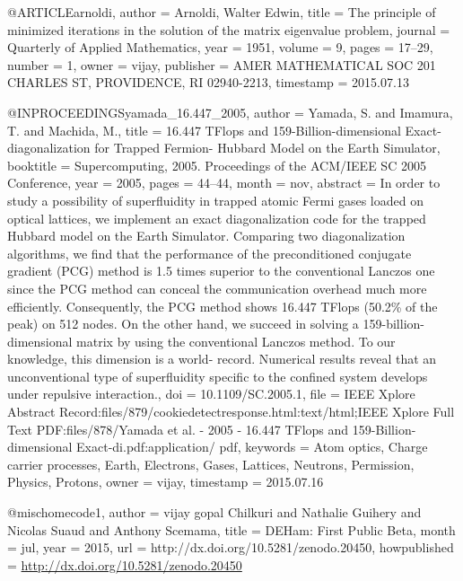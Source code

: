 @ARTICLE{arnoldi,
  author = {Arnoldi, Walter Edwin},
  title = {The principle of minimized iterations in the solution of the matrix
	eigenvalue problem},
  journal = {Quarterly of Applied Mathematics},
  year = {1951},
  volume = {9},
  pages = {17--29},
  number = {1},
  owner = {vijay},
  publisher = {AMER MATHEMATICAL SOC 201 CHARLES ST, PROVIDENCE, RI 02940-2213},
  timestamp = {2015.07.13}
}

@INPROCEEDINGS{yamada_16.447_2005,
  author = {Yamada, S. and Imamura, T. and Machida, M.},
  title = {16.447 {TFlops} and 159-{Billion}-dimensional {Exact}-diagonalization
	for {Trapped} {Fermion}- {Hubbard} {Model} on the {Earth} {Simulator}},
  booktitle = {Supercomputing, 2005. {Proceedings} of the {ACM}/{IEEE} {SC} 2005
	{Conference}},
  year = {2005},
  pages = {44--44},
  month = nov,
  abstract = {In order to study a possibility of superfluidity in trapped atomic
	Fermi gases loaded on optical lattices, we implement an exact diagonalization
	code for the trapped Hubbard model on the Earth Simulator. Comparing
	two diagonalization algorithms, we find that the performance of the
	preconditioned conjugate gradient (PCG) method is 1.5 times superior
	to the conventional Lanczos one since the PCG method can conceal
	the communication overhead much more efficiently. Consequently, the
	PCG method shows 16.447 TFlops (50.2\% of the peak) on 512 nodes.
	On the other hand, we succeed in solving a 159-billion- dimensional
	matrix by using the conventional Lanczos method. To our knowledge,
	this dimension is a world- record. Numerical results reveal that
	an unconventional type of superfluidity specific to the confined
	system develops under repulsive interaction.},
  doi = {10.1109/SC.2005.1},
  file = {IEEE Xplore Abstract Record:files/879/cookiedetectresponse.html:text/html;IEEE Xplore Full Text  PDF:files/878/Yamada et al. - 2005 - 16.447 TFlops and 159-Billion-dimensional Exact-di.pdf:application/  pdf},
  keywords = {Atom optics, Charge carrier processes, Earth, Electrons, Gases, Lattices,
	Neutrons, Permission, Physics, Protons},
  owner = {vijay},
  timestamp = {2015.07.16}
}

@misc{homecode1,
  author       = {vijay gopal Chilkuri and
                  Nathalie Guihery and
                  Nicolas Suaud and
                  Anthony Scemama},
  title        = {DEHam: First Public Beta},
  month        = jul,
  year         = {2015},
  url          = {http://dx.doi.org/10.5281/zenodo.20450},
  howpublished = {\url{http://dx.doi.org/10.5281/zenodo.20450}}
}

